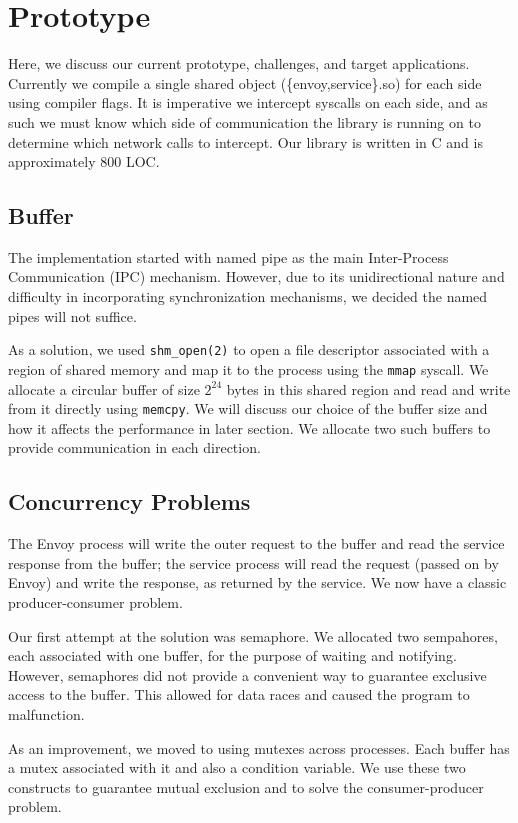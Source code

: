 \section{Prototype}
\label{sec:prototype}
Here, we discuss our current prototype, challenges, and target applications.
Currently we compile a single shared object (\{envoy,service\}.so) for each side using compiler flags.
It is imperative we intercept syscalls on each side, and as such we must know which side of communication the library is running on to determine which network calls to intercept.
Our library is written in C and is approximately 800 LOC.

\subsection{\sysname Buffer}
The implementation started with named pipe as the main Inter-Process Communication (IPC) mechanism. However, due to its unidirectional nature and difficulty in incorporating synchronization mechanisms, we decided the named pipes will not suffice.

As a solution, we used \texttt{shm\_open(2)} to open a file descriptor associated with a region of shared memory and map it to the process using the \texttt{mmap} syscall. We allocate a circular buffer of size $2^{24}$ bytes in this shared region and read and write from it directly using \texttt{memcpy}. We will discuss our choice of the buffer size and how it affects the performance in later section. We allocate two such buffers to provide communication in each direction.

\subsection{Concurrency Problems}
The Envoy process will write the outer request to the buffer and read the service response from the buffer; the service process will read the request (passed on by Envoy) and write the response, as returned by the service. We now have a classic producer-consumer problem.

Our first attempt at the solution was semaphore. We allocated two sempahores, each associated with one buffer, for the purpose of waiting and notifying. However, semaphores did not provide a convenient way to guarantee exclusive access to the buffer. This allowed for data races and caused the program to malfunction.

As an improvement, we moved to using mutexes across processes. Each buffer has a mutex associated with it and also a condition variable. We use these two constructs to guarantee mutual exclusion and to solve the consumer-producer problem.

